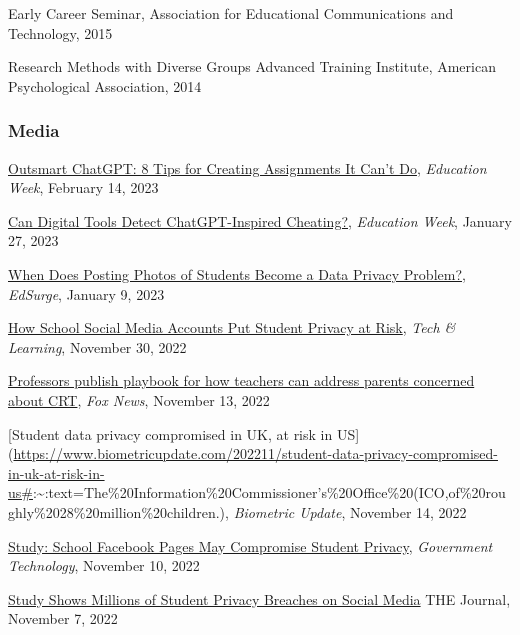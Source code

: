 \documentclass[
  14,
]{article}
\begin{document}
Early Career Seminar, Association for Educational Communications and
Technology, 2015

Research Methods with Diverse Groups Advanced Training Institute,
American Psychological Association, 2014

\hypertarget{media}{%
\subsubsection{Media}\label{media}}

\href{https://www.edweek.org/technology/outsmart-chatgpt-8-tips-for-creating-assignments-it-cant-do/2023/02}{Outsmart
ChatGPT: 8 Tips for Creating Assignments It Can't Do}, \emph{Education
Week}, February 14, 2023

\href{https://www.edweek.org/technology/can-digital-tools-detect-chatgpt-inspired-cheating/2023/01}{Can
Digital Tools Detect ChatGPT-Inspired Cheating?}, \emph{Education Week},
January 27, 2023

\href{https://www.edsurge.com/news/2023-01-09-when-does-posting-photos-of-students-become-a-data-privacy-problem}{When
Does Posting Photos of Students Become a Data Privacy Problem?},
\emph{EdSurge}, January 9, 2023

\href{https://www.techlearning.com/news/are-school-social-media-accounts-putting-student-privacy-at-risk}{How
School Social Media Accounts Put Student Privacy at Risk}, \emph{Tech \&
Learning}, November 30, 2022

\href{https://www.foxnews.com/us/professors-publish-playbook-teachers-address-parents-concerned-crt}{Professors
publish playbook for how teachers can address parents concerned about
CRT}, \emph{Fox News}, November 13, 2022

{[}Student data privacy compromised in UK, at risk in
US{]}(\url{https://www.biometricupdate.com/202211/student-data-privacy-compromised-in-uk-at-risk-in-us\#}:\textasciitilde:text=The\%20Information\%20Commissioner's\%20Office\%20(ICO,of\%20roughly\%2028\%20million\%20children.),
\emph{Biometric Update}, November 14, 2022

\href{https://www.govtech.com/education/k-12/study-school-facebook-pages-may-compromise-student-privacy}{Study:
School Facebook Pages May Compromise Student Privacy}, \emph{Government
Technology}, November 10, 2022

\href{https://thejournal.com/articles/2022/11/07/study-shows-millions-of-student-privacy-breaches-on-social-media.aspx}{Study
Shows Millions of Student Privacy Breaches on Social Media} THE Journal,
November 7, 2022
\end{document}
